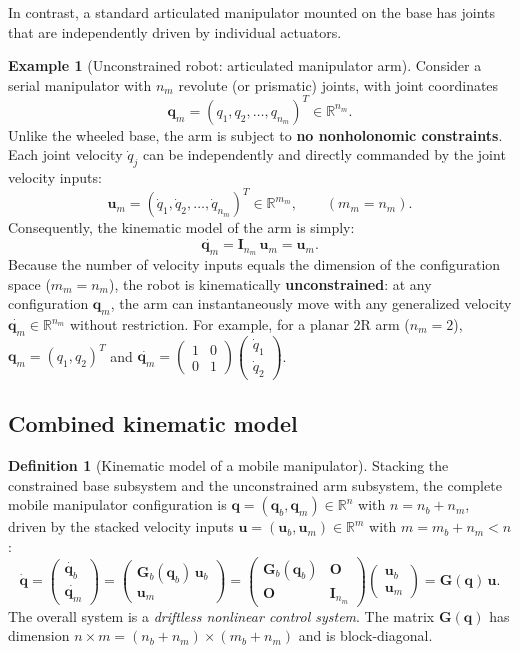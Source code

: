 \documentclass[11pt,a4paper]{article}
\newcommand{\qbase}{\bm{q}_b}
\newcommand{\qarm}{\bm{q}_m}
\newcommand{\ubase}{\bm{u}_b}
\newcommand{\uarm}{\bm{u}_m}
\newcommand{\Gbase}{\bm{G}_b}
\newcommand{\R}{\mathbb{R}}
\theoremstyle{plain}
\theoremstyle{definition}
\newtheorem{definition}[theorem]{Definition}
\newtheorem{example}[theorem]{Example}
\theoremstyle{remark}
\begin{document}
In contrast, a standard articulated manipulator mounted on the base has joints that are independently driven by individual actuators.

\begin{example}[Unconstrained robot: articulated manipulator arm]
Consider a serial manipulator with $n_m$ revolute (or prismatic) joints, with joint coordinates
\[
\qarm = (q_1, q_2, \dots, q_{n_m})^T \in \R^{n_m}.
\]
Unlike the wheeled base, the arm is subject to \textbf{no nonholonomic constraints}. Each joint velocity $\dot q_j$ can be independently and directly commanded by the joint velocity inputs:
\[
\uarm = (\dot q_1, \dot q_2, \dots, \dot q_{n_m})^T \in \R^{m_m},\qquad (m_m = n_m).
\]
Consequently, the kinematic model of the arm is simply:
\[
\dot{\qarm} = \bm I_{n_m}\,\uarm = \uarm .
\]
Because the number of velocity inputs equals the dimension of the configuration space ($m_m = n_m$), the robot is kinematically \textbf{unconstrained}: at any configuration $\qarm$, the arm can instantaneously move with any generalized velocity $\dot{\qarm}\in\R^{n_m}$ without restriction. For example, for a planar 2R arm ($n_m = 2$), $\qarm = (q_1, q_2)^T$ and $\dot{\qarm} = \begin{pmatrix}1 & 0\\ 0 & 1\end{pmatrix}\begin{pmatrix}\dot q_1\\ \dot q_2\end{pmatrix}$.
\end{example}

\subsection*{Combined kinematic model}

\begin{definition}[Kinematic model of a mobile manipulator]
Stacking the constrained base subsystem and the unconstrained arm subsystem, the complete mobile manipulator configuration is $\bm q = (\qbase, \qarm) \in \R^{n}$ with $n = n_b + n_m$, driven by the stacked velocity inputs $\bm u = (\ubase, \uarm) \in \R^{m}$ with $m = m_b + n_m < n$:
\[
\dot{\bm q}=\begin{pmatrix}\dot{\qbase}\\ \dot{\qarm}\end{pmatrix}
=\begin{pmatrix}\Gbase(\qbase)\,\ubase\\ \uarm\end{pmatrix}
=\begin{pmatrix}\Gbase(\qbase)&\bm O\\ \bm O&\bm I_{n_m}\end{pmatrix}
\begin{pmatrix}\ubase\\ \uarm\end{pmatrix}=\bm G(\bm q)\,\bm u .
\]
The overall system is a \emph{driftless nonlinear control system}. The matrix $\bm G(\bm q)$ has dimension $n \times m = (n_b + n_m) \times (m_b + n_m)$ and is block-diagonal.
\end{definition}
\end{document}

